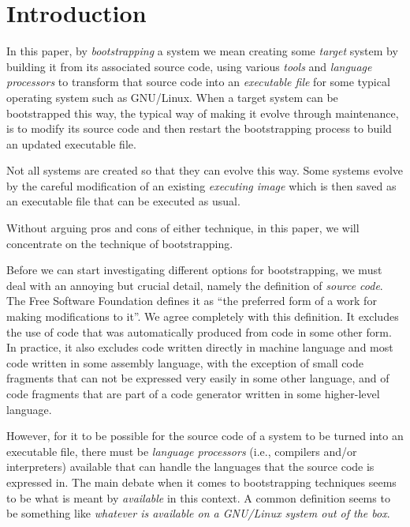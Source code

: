 \section{Introduction}
\label{sec-introduction}

In this paper, by \emph{bootstrapping} a \commonlisp{}
system we mean creating some \emph{target} \commonlisp{} system by
building it from its associated source code, using various
\emph{tools} and \emph{language processors} to transform that source
code into an \emph{executable file} for some typical operating system
such as GNU/Linux.  When a target \commonlisp{} system can be
bootstrapped this way, the typical way of making it evolve through
maintenance, is to modify its source code and then restart the
bootstrapping process to build an updated executable file.

Not all \commonlisp{} systems are created so that they can evolve this
way.  Some systems evolve by the careful modification of an existing
\emph{executing image} which is then saved as an executable file that
can be executed as usual.

Without arguing pros and cons of either technique, in this paper, we
will concentrate on the technique of bootstrapping.

Before we can start investigating different options for bootstrapping,
we must deal with an annoying but crucial detail, namely the
definition of \emph{source code}.  The Free Software Foundation
defines it as ``the preferred form of a work for making modifications
to it''.  We agree completely with this definition.  It excludes the
use of code that was automatically produced from code in some other
form.  In practice, it also excludes code written directly in machine
language and most code written in some assembly language, with the
exception of small code fragments that can not be expressed very
easily in some other language, and of code fragments that are part of
a code generator written in some higher-level language.

However, for it to be possible for the source code of a \commonlisp{}
system to be turned into an executable file, there must be
\emph{language processors} (i.e., compilers and/or interpreters)
available that can handle the languages that the source code is
expressed in.  The main debate when it comes to bootstrapping
techniques seems to be what is meant by \emph{available} in this
context.  A common definition seems to be something like
\emph{whatever is available on a GNU/Linux system out of the box}.

